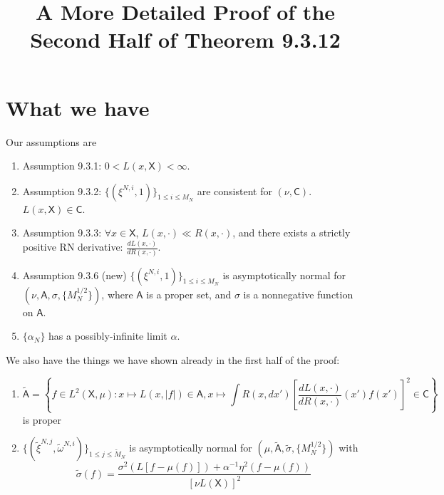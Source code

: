 \documentclass{article}
\title{A More Detailed Proof of the Second Half of Theorem 9.3.12}
\begin{document}
\maketitle

\section{What we have}

Our assumptions are

\begin{enumerate}

\item Assumption 9.3.1: $0 < L(x,\mathsf{X}) < \infty$.

\item Assumption 9.3.2: $\{(\xi^{N,i},1)\}_{1 \le i \le M_N}$ are consistent for $(\nu, \mathsf{C})$. $L(x,\mathsf{X}) \in \mathsf{C}$.

\item Assumption 9.3.3: $\forall x \in \mathsf{X}$, $L(x, \cdot) \ll R(x, \cdot)$, and there exists a strictly positive RN derivative: $\frac{dL(x,\cdot )}{dR(x, \cdot)}$.

\item Assumption 9.3.6 (new) $\{ (\xi^{N,i} , 1)\}_{1 \le i \le M_N}$ is asymptotically normal for $(\nu, \mathsf{A}, \sigma, \{M_N^{1/2}\})$, where $\mathsf{A}$ is a proper set, and $\sigma$ is a nonnegative function on $\mathsf{A}$.

\item $\{\alpha_N\}$ has a possibly-infinite limit $\alpha$.

\end{enumerate}

We also have the things we have shown already in the first half of the proof:

\begin{enumerate}

\item 
$$
\tilde{\mathsf{A}} = 
\left\{ 
f \in L^2(\mathsf{X}, \mu) : 
x \mapsto L(x,|f|) \in \mathsf{A},
x \mapsto \int R(x,dx') \left[ \frac{dL(x,\cdot)}{dR(x,\cdot)}(x') f(x')\right]^2 \in \mathsf{C}
\right\}
$$ is proper

\item $\{(\tilde{\xi}^{N,j}, \tilde{\omega}^{N,i} ) \}_{1 \le j \le \tilde{M}_N}$ is asymptotically normal for $(\mu, \tilde{\mathsf{A}}, \tilde{\sigma}, \{M_N^{1/2}\})$ with
$$
\tilde{\sigma}(f)  =
\frac{\sigma^2\left( L[f-\mu(f)] \right) + \alpha^{-1} \eta^2\left(f - \mu(f) \right)}{[\nu L(\mathsf{X})]^2 }
$$
\end{enumerate}
\end{document}
